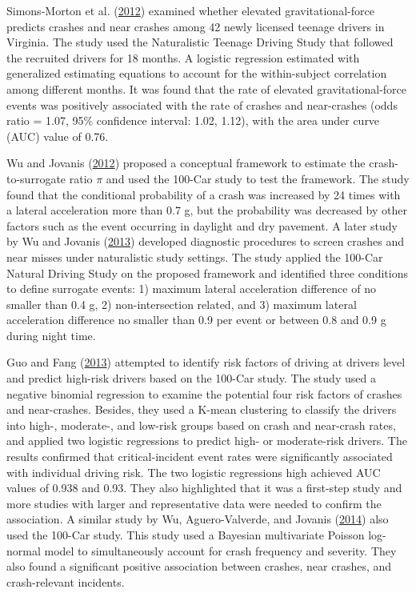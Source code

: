 \documentclass[12pt]{book}
\numberwithin{equation}{chapter}
\begin{document}
Simons-Morton et al. (\protect\hyperlink{ref-simons2012elevated}{2012}) examined whether elevated gravitational-force predicts crashes and near crashes among 42 newly licensed teenage drivers in Virginia. The study used the Naturalistic Teenage Driving Study that followed the recruited drivers for 18 months. A logistic regression estimated with generalized estimating equations to account for the within-subject correlation among different months. It was found that the rate of elevated gravitational-force events was positively associated with the rate of crashes and near-crashes (odds ratio = 1.07, 95\% confidence interval: 1.02, 1.12), with the area under curve (AUC) value of 0.76.

Wu and Jovanis (\protect\hyperlink{ref-wu2012crashes}{2012}) proposed a conceptual framework to estimate the crash-to-surrogate ratio \(\pi\) and used the 100-Car study to test the framework. The study found that the conditional probability of a crash was increased by 24 times with a lateral acceleration more than 0.7 g, but the probability was decreased by other factors such as the event occurring in daylight and dry pavement. A later study by Wu and Jovanis (\protect\hyperlink{ref-wu2013defining}{2013}) developed diagnostic procedures to screen crashes and near misses under naturalistic study settings. The study applied the 100-Car Natural Driving Study on the proposed framework and identified three conditions to define surrogate events: 1) maximum lateral acceleration difference of no smaller than 0.4 g, 2) non-intersection related, and 3) maximum lateral acceleration difference no smaller than 0.9 per event or between 0.8 and 0.9 g during night time.

Guo and Fang (\protect\hyperlink{ref-guo2013individual}{2013}) attempted to identify risk factors of driving at drivers level and predict high-risk drivers based on the 100-Car study. The study used a negative binomial regression to examine the potential four risk factors of crashes and near-crashes. Besides, they used a K-mean clustering to classify the drivers into high-, moderate-, and low-risk groups based on crash and near-crash rates, and applied two logistic regressions to predict high- or moderate-risk drivers. The results confirmed that critical-incident event rates were significantly associated with individual driving risk. The two logistic regressions high achieved AUC values of 0.938 and 0.93. They also highlighted that it was a first-step study and more studies with larger and representative data were needed to confirm the association. A similar study by Wu, Aguero-Valverde, and Jovanis (\protect\hyperlink{ref-wu2014using}{2014}) also used the 100-Car study. This study used a Bayesian multivariate Poisson log-normal model to simultaneously account for crash frequency and severity. They also found a significant positive association between crashes, near crashes, and crash-relevant incidents.
\end{document}
